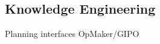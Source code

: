 \subsection{Knowledge Engineering}\label{subsec:Knowledge Engineering}
Planning interfaces
OpMaker/GIPO



